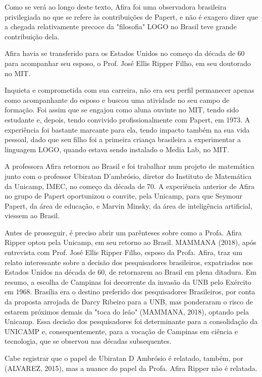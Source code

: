 Como se verá ao longo deste texto, Afira foi uma observadora brasileira privilegiada no que se refere às contribuições de Papert, e não é exagero dizer que a chegada relativamente precoce da "filosofia" LOGO no Brasil teve grande contribuição dela.

Afira havia se transferido para os Estados Unidos no começo da década de 60 para acompanhar seu esposo, o Prof. José Ellis Ripper Filho, em seu doutorado no MIT.

Inquieta e comprometida com sua carreira, não era seu perfil permanecer apenas como acompanhante do esposo e buscou uma atividade no seu campo de formação. Foi assim que se engajou como aluna ouvinte no MIT, tendo sido estudante e, depois, tendo convivido profissionalmente com Papert, em 1973. A experiência foi bastante marcante para ela, tendo impacto também na sua vida pessoal, dado que seu filho foi a primeira criança brasileira a experimentar a linguagem LOGO, quando estava sendo instalado o Media Lab, no MIT.

A professora Afira retornou ao Brasil e foi trabalhar num projeto de matemática junto com o professor Ubiratan D’ambrósio, diretor do Instituto de Matemática da Unicamp, IMEC, no começo da década de 70. A experiência anterior de Afira no grupo de Papert oportunizou o convite, pela Unicamp, para que Seymour Papert, da área de educação, e Marvin Minsky, da área de inteligência artificial, viessem ao Brasil.

Antes de prosseguir, é preciso abrir um parênteses sobre como a Profa. Afira Ripper optou pela Unicamp, em seu retorno ao Brasil.  MAMMANA (2018), após entrevista com Prof. José Ellis Ripper Filho, esposo da Profa. Afira, traz um relato interessante sobre a decisão dos pesquisadores brasileiros, expatriados nos Estados Unidos na década de 60, de retornarem ao Brasil em plena ditadura. Em resumo, a escolha de Campinas foi decorrente da invasão da UNB pelo Exército em 1968. Brasília era o destino preferido dos pesquisadores Brasileiros, por conta da proposta arrojada de Darcy Ribeiro para a UNB, mas ponderaram o risco de estarem próximos demais da "toca do leão"  (MAMMANA, 2018), optando pela Unicamp. Essa decisão dos pesquisadores foi determinante para a consolidação da UNICAMP e, consequentemente, para a vocação de Campinas em ciência e tecnologia, que se observou nas décadas subsequentes.

Cabe registrar que o papel de Ubiratan D Ambrósio é relatado, também, por (ALVAREZ, 2015), mas a nuance do papel da Profa. Afira Ripper não é relatada.

